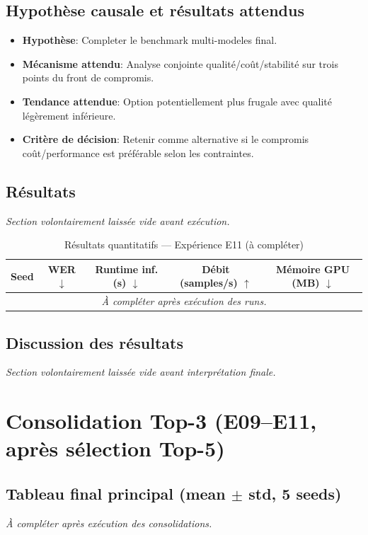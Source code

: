 \documentclass[11pt,a4paper]{article}
\begin{document}
\subsection{Hypothèse causale et résultats attendus}
\begin{itemize}[leftmargin=1.2cm]
\item \textbf{Hypothèse}: Completer le benchmark multi-modeles final.
\item \textbf{Mécanisme attendu}: Analyse conjointe qualité/coût/stabilité sur trois points du front de compromis.
\item \textbf{Tendance attendue}: Option potentiellement plus frugale avec qualité légèrement inférieure.
\item \textbf{Critère de décision}: Retenir comme alternative si le compromis coût/performance est préférable selon les contraintes.
\end{itemize}

\subsection{Résultats}
\textit{Section volontairement laissée vide avant exécution.}

\begin{table}[H]
\centering
\caption{Résultats quantitatifs --- Expérience E11 (à compléter)}
\begin{tabular}{lcccc}
\toprule
Seed & WER $\downarrow$ & Runtime inf. (s) $\downarrow$ & Débit (samples/s) $\uparrow$ & Mémoire GPU (MB) $\downarrow$ \\
\midrule
\multicolumn{5}{c}{\textit{À compléter après exécution des runs.}} \\
\bottomrule
\end{tabular}
\end{table}

\subsection{Discussion des résultats}
\textit{Section volontairement laissée vide avant interprétation finale.}


\section{Consolidation Top-3 (E09--E11, après sélection Top-5)}
\subsection{Tableau final principal (mean $\pm$ std, 5 seeds)}
\textit{À compléter après exécution des consolidations.}
\end{document}
